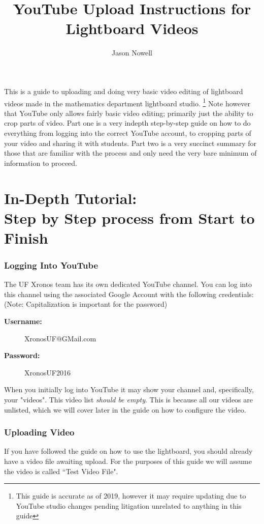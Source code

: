 \documentclass{article}
\title{YouTube Upload Instructions for Lightboard Videos}
\author{Jason Nowell}
\date{}
\begin{document}
\maketitle


This is a guide to uploading and doing very basic video editing of lightboard videos made in the mathematics department lightboard studio.%
\footnote{This guide is accurate as of 2019, however it may require updating due to YouTube studio changes pending litigation unrelated to anything in this guide}%
Note however that YouTube only allows fairly basic video editing; primarily just the ability to crop parts of video. Part one is a very indepth step-by-step guide on how to do everything from logging into the correct YouTube account, to cropping parts of your video and sharing it with students. Part two is a very succinct summary for those that are familiar with the process and only need the very bare minimum of information to proceed.


\tableofcontents

\newpage

\part{In-Depth Tutorial: \\ Step by Step process from Start to Finish}
\label{partOne}
    \section{Logging Into YouTube}
    \label{loggingOn}
        The UF Xronos team has its own dedicated YouTube channel. You can log into this channel using the associated Google Account with the following credentials: (Note: Capitalization is important for the password)
        \begin{description}
            \item[\textbf{Username:}] XronosUF@GMail.com
            \item[\textbf{Password:}] XronosUF2016
        \end{description}
        
        When you initially log into YouTube it may show your channel and, specifically, your "videos". This video list \textit{should be empty}. This is because all our videos are unlisted, which we will cover later in the guide on how to configure the video.
    
    \section{Uploading Video}
        If you have followed the guide on how to use the lightboard, you should already have a video file awaiting upload. For the purposes of this guide we will assume the video is called ``Test Video File". \\
        
\end{document}
